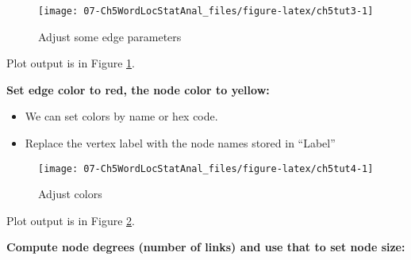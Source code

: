 \documentclass[
]{article}
\newenvironment{Shaded}{\begin{snugshade}}{\end{snugshade}}
\newcommand{\AttributeTok}[1]{\textcolor[rgb]{0.13,0.29,0.53}{#1}}
\newcommand{\DecValTok}[1]{\textcolor[rgb]{0.00,0.00,0.81}{#1}}
\newcommand{\FunctionTok}[1]{\textcolor[rgb]{0.13,0.29,0.53}{\textbf{#1}}}
\newcommand{\NormalTok}[1]{#1}
\newcommand{\OtherTok}[1]{\textcolor[rgb]{0.56,0.35,0.01}{#1}}
\newcommand{\SpecialCharTok}[1]{\textcolor[rgb]{0.81,0.36,0.00}{\textbf{#1}}}
\newcommand{\StringTok}[1]{\textcolor[rgb]{0.31,0.60,0.02}{#1}}
\providecommand{\tightlist}{%
  \setlength{\itemsep}{0pt}\setlength{\parskip}{0pt}}
\begin{document}
\begin{figure}

{\centering \texttt{[image: 07-Ch5WordLocStatAnal\_files/figure-latex/ch5tut3-1]} 

}

\caption{Adjust some edge parameters}\label{fig:ch5tut3}
\end{figure}

Plot output is in Figure \ref{fig:ch5tut3}.

\textbf{Set edge color to red, the node color to yellow:}

\begin{itemize}
\tightlist
\item
  We can set colors by name or hex code.
\item
  Replace the vertex label with the node names stored in ``Label''
\end{itemize}

\begin{Shaded}
\end{Shaded}

\begin{figure}

{\centering \texttt{[image: 07-Ch5WordLocStatAnal\_files/figure-latex/ch5tut4-1]} 

}

\caption{Adjust colors}\label{fig:ch5tut4}
\end{figure}

Plot output is in Figure \ref{fig:ch5tut4}.

\textbf{Compute node degrees (number of links) and use that to set node size:}

\begin{Shaded}
\end{Shaded}
\end{document}

